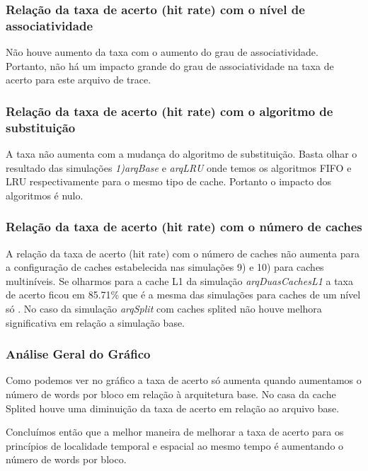\documentclass[10pt,a4paper]{article}
\begin{document}
\subsubsection{Relação da taxa de acerto (hit rate) com o nível de associatividade}
Não houve aumento da taxa com o aumento do grau de associatividade. Portanto, não há um impacto grande do grau de associatividade na taxa de acerto para este arquivo de trace.
\subsubsection{Relação da taxa de acerto (hit rate) com o algoritmo de substituição}
A taxa não aumenta com a mudança do algoritmo de substituição. Basta olhar o resultado das simulações \textit{1)arqBase} e \textit{arqLRU} onde temos os algoritmos FIFO e LRU respectivamente para o mesmo tipo de cache. Portanto o impacto dos algoritmos é nulo.
\subsubsection{Relação da taxa de acerto (hit rate) com o número de caches}
A relação da taxa de acerto (hit rate) com o número de caches não aumenta para a configuração de caches estabelecida nas simulações 9) e 10) para caches multiníveis. Se olharmos para a cache L1 da simulação \textit{arqDuasCachesL1} a taxa de acerto ficou em 85.71\% que é a mesma das simulações para caches de um nível só . No caso da simulação \textit{arqSplit} com caches splited não houve melhora significativa em relação a simulação base.
\subsubsection{Análise Geral do Gráfico}
Como podemos ver no gráfico a taxa de acerto só aumenta quando aumentamos o número de words por bloco em relação à arquitetura base. No casa da cache Splited houve uma diminuição da taxa de acerto em relação ao arquivo base.

Concluímos então que a melhor maneira de melhorar a taxa de acerto para os princípios de localidade temporal e  espacial ao mesmo tempo é aumentando o número de words por bloco.
\end{document}
